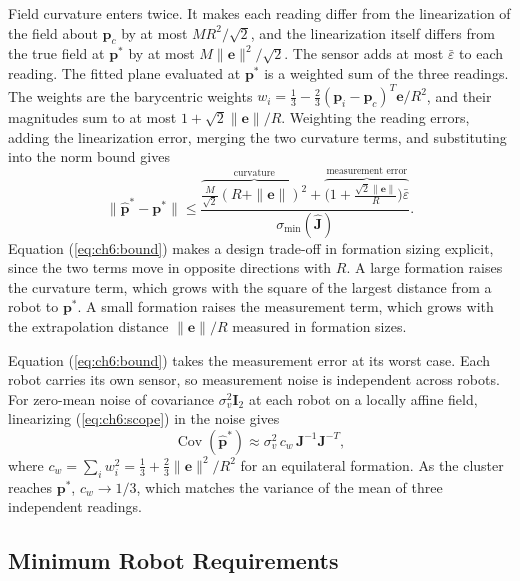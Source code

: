 Field curvature enters twice. It makes each reading differ from the linearization of the field about $\mathbf{p}_c$ by at most $MR^2/\sqrt{2}$, and the linearization itself differs from the true field at $\mathbf{p}^*$ by at most $M\|\mathbf{e}\|^2/\sqrt{2}$. The sensor adds at most $\bar{\varepsilon}$ to each reading. The fitted plane evaluated at $\mathbf{p}^*$ is a weighted sum of the three readings. The weights are the barycentric weights $w_i = \frac{1}{3} - \frac{2}{3}(\mathbf{p}_i - \mathbf{p}_c)^T\mathbf{e}/R^2$, and their magnitudes sum to at most $1 + \sqrt{2}\|\mathbf{e}\|/R$. Weighting the reading errors, adding the linearization error, merging the two curvature terms, and substituting into the norm bound gives
\begin{equation}\label{eq:ch6:bound}
\|\hat{\mathbf{p}}^* - \mathbf{p}^*\| \le \frac{\overbrace{\tfrac{M}{\sqrt{2}}(R + \|\mathbf{e}\|)^2}^{\text{curvature}} + \overbrace{\bigl(1 + \tfrac{\sqrt{2}\|\mathbf{e}\|}{R}\bigr)\bar{\varepsilon}}^{\text{measurement error}}}{\sigma_{\min}(\hat{\mathbf{J}})}.
\end{equation}
Equation (\ref{eq:ch6:bound}) makes a design trade-off in formation sizing explicit, since the two terms move in opposite directions with $R$. A large formation raises the curvature term, which grows with the square of the largest distance from a robot to $\mathbf{p}^*$. A small formation raises the measurement term, which grows with the extrapolation distance $\|\mathbf{e}\|/R$ measured in formation sizes.

Equation (\ref{eq:ch6:bound}) takes the measurement error at its worst case. Each robot carries its own sensor, so measurement noise is independent across robots. For zero-mean noise of covariance $\sigma_v^2\mathbf{I}_2$ at each robot on a locally affine field, linearizing (\ref{eq:ch6:scope}) in the noise gives
\begin{equation}\label{eq:ch6:cov}
\operatorname{Cov}(\hat{\mathbf{p}}^*) \approx \sigma_v^2\, c_w\, \mathbf{J}^{-1}\mathbf{J}^{-T},
\end{equation}
where $c_w = \sum_i w_i^2 = \frac{1}{3} + \frac{2}{3}\|\mathbf{e}\|^2/R^2$ for an equilateral formation. As the cluster reaches $\mathbf{p}^*$, $c_w \to 1/3$, which matches the variance of the mean of three independent readings.

\subsection{Minimum Robot Requirements}
\label{sec:ch6:minimum}

